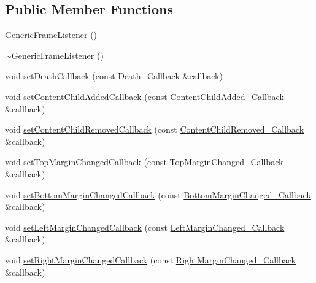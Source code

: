 \subsection*{Public Member Functions}
\begin{DoxyCompactItemize}
\item 
\mbox{\hyperlink{classec_1_1_generic_frame_listener_ab8e13c391e14fb4bab3b542c739da85a}{Generic\+Frame\+Listener}} ()
\item 
\mbox{\hyperlink{classec_1_1_generic_frame_listener_a2ed44b70a0d02224c9b59acd7ad16761}{$\sim$\+Generic\+Frame\+Listener}} ()
\item 
void \mbox{\hyperlink{classec_1_1_generic_frame_listener_aedc7f30478b6793e99813b36e5bc2531}{set\+Death\+Callback}} (const \mbox{\hyperlink{classec_1_1_generic_frame_listener_ac879048f08e2089e7cc5ae954fc2aad9}{Death\+\_\+\+Callback}} \&callback)
\item 
void \mbox{\hyperlink{classec_1_1_generic_frame_listener_abc0e2510ddf60f31fffbf8cd8205d7e5}{set\+Content\+Child\+Added\+Callback}} (const \mbox{\hyperlink{classec_1_1_generic_frame_listener_a60609130cab4035d4dd9315cca67e7e9}{Content\+Child\+Added\+\_\+\+Callback}} \&callback)
\item 
void \mbox{\hyperlink{classec_1_1_generic_frame_listener_a9093cd9c792051f2e4428e57bd4cedc7}{set\+Content\+Child\+Removed\+Callback}} (const \mbox{\hyperlink{classec_1_1_generic_frame_listener_afe73c15b94012dd918638ee8fa11a67e}{Content\+Child\+Removed\+\_\+\+Callback}} \&callback)
\item 
void \mbox{\hyperlink{classec_1_1_generic_frame_listener_acc1e457be5d409aac7be37cdc4aa11c6}{set\+Top\+Margin\+Changed\+Callback}} (const \mbox{\hyperlink{classec_1_1_generic_frame_listener_a67f7b45b927d5bbdf39a7e0ce1da0cf5}{Top\+Margin\+Changed\+\_\+\+Callback}} \&callback)
\item 
void \mbox{\hyperlink{classec_1_1_generic_frame_listener_a110ef9d908ae2a711f3d21b555902a5c}{set\+Bottom\+Margin\+Changed\+Callback}} (const \mbox{\hyperlink{classec_1_1_generic_frame_listener_aadeca32c32883e7951bd27b6a9a9d06a}{Bottom\+Margin\+Changed\+\_\+\+Callback}} \&callback)
\item 
void \mbox{\hyperlink{classec_1_1_generic_frame_listener_af31fa26f4e8226757932383a3e0f00ca}{set\+Left\+Margin\+Changed\+Callback}} (const \mbox{\hyperlink{classec_1_1_generic_frame_listener_aca4694f1cf253669d8cd51045de4be46}{Left\+Margin\+Changed\+\_\+\+Callback}} \&callback)
\item 
void \mbox{\hyperlink{classec_1_1_generic_frame_listener_a879fbb482d9ec07cd6fbc5c2dff963a6}{set\+Right\+Margin\+Changed\+Callback}} (const \mbox{\hyperlink{classec_1_1_generic_frame_listener_a6df716c696c9f2d91a4ff152026c5493}{Right\+Margin\+Changed\+\_\+\+Callback}} \&callback)

\end{DoxyCompactItemize}
